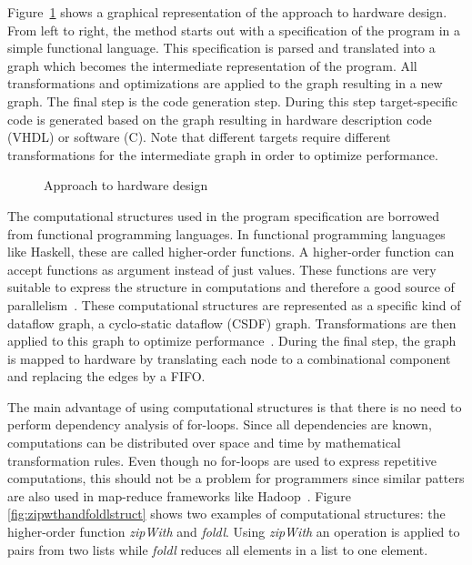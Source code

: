 \makeatother\documentclass[10pt,english,oneside,twocolumn,a4paper]{article}%
\begin{document}
  Figure~\ref{fig:approach} shows a graphical representation of the approach to hardware design.
  From left to right, the method starts out with a specification of the program in a simple functional language.
  This specification is parsed and translated into a graph which becomes the intermediate representation of the program.
  All transformations and optimizations are applied to the graph resulting in a new graph.
  The final step is the code generation step.
  During this step target-specific code is generated based on the graph resulting in hardware description code (VHDL) or software (C).
  Note that different targets require different transformations for the intermediate graph in order to optimize performance.

  \begin{figure}[h!]
    \centering
    
    \caption{Approach to hardware design}
    \label{fig:approach}
  \end{figure}

  The computational structures used in the program  specification are borrowed from functional programming languages.
  In functional programming languages like Haskell, these are called higher-order functions.
  A higher-order function can accept functions as argument instead of just values.
  These functions are very suitable to express the structure in computations and therefore a good source of parallelism~\cite{Wester15}.
  These computational structures are represented as a specific kind of dataflow graph, a cyclo-static dataflow (CSDF) graph.
  Transformations are then applied to this graph to optimize performance~\cite{deGroote16}.
  During the final step, the graph is mapped to hardware by translating each node to a combinational component and replacing the edges by a FIFO.

  The main advantage of using computational structures is that there is no need to perform dependency analysis of for-loops.
  Since all dependencies are known, computations can be distributed over space and time by mathematical transformation rules.
  Even though no for-loops are used to express repetitive computations, this should not be a problem for programmers since similar patters are also used in map-reduce frameworks like Hadoop~\cite{shvachko2010}.
  Figure \ref{fig:zipwthandfoldlstruct} shows two examples of computational structures: the higher-order function \emph{zipWith} and \emph{foldl}.
  Using \emph{zipWith} an operation is applied to pairs from two lists while \emph{foldl} reduces all elements in a list to one element.
\end{document}
